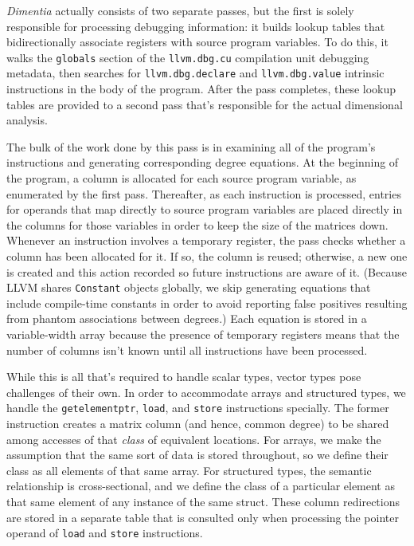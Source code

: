 \documentclass[12pt]{article}
\begin{document}
\textit{Dimentia} actually consists of two separate passes, but the first is solely responsible for processing debugging information: it builds lookup tables that bidirectionally associate registers with source program variables.
To do this, it walks the \texttt{globals} section of the \texttt{llvm.dbg.cu} compilation unit debugging metadata, then searches for \texttt{llvm.dbg.declare} and \texttt{llvm.dbg.value} intrinsic instructions in the body of the program.
After the pass completes, these lookup tables are provided to a second pass that's responsible for the actual dimensional analysis.

The bulk of the work done by this pass is in examining all of the program's instructions and generating corresponding degree equations.
At the beginning of the program, a column is allocated for each source program variable, as enumerated by the first pass.
Thereafter, as each instruction is processed, entries for operands that map directly to source program variables are placed directly in the columns for those variables in order to keep the size of the matrices down.
Whenever an instruction involves a temporary register, the pass checks whether a column has been allocated for it.
If so, the column is reused; otherwise, a new one is created and this action recorded so future instructions are aware of it.
(Because LLVM shares \texttt{Constant} objects globally, we skip generating equations that include compile-time constants in order to avoid reporting false positives resulting from phantom associations between degrees.)
Each equation is stored in a variable-width array because the presence of temporary registers means that the number of columns isn't known until all instructions have been processed.

While this is all that's required to handle scalar types, vector types pose challenges of their own.
In order to accommodate arrays and structured types, we handle the \texttt{getelementptr}, \texttt{load}, and \texttt{store} instructions specially.
The former instruction creates a matrix column (and hence, common degree) to be shared among accesses of that \textit{class} of equivalent locations.
For arrays, we make the assumption that the same sort of data is stored throughout, so we define their class as all elements of that same array.
For structured types, the semantic relationship is cross-sectional, and we define the class of a particular element as that same element of any instance of the same struct.
These column redirections are stored in a separate table that is consulted only when processing the pointer operand of \texttt{load} and \texttt{store} instructions.
\end{document}
